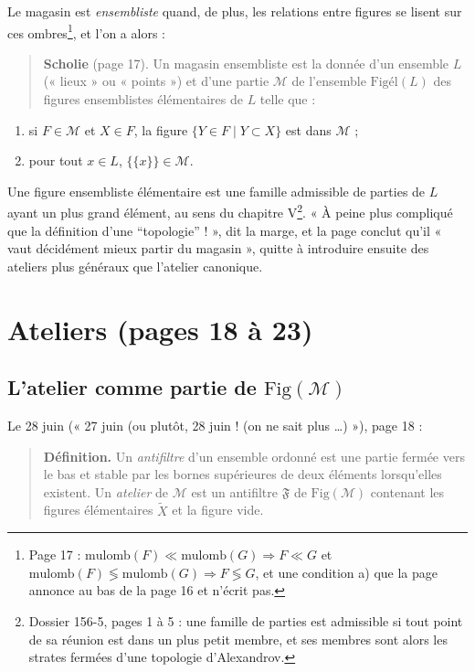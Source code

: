 \documentclass[11pt,a4paper]{article}
\begin{document}
Le magasin est \emph{ensembliste} quand, de plus, les relations entre figures
se lisent sur ces ombres\footnote{Page 17 : $\mathrm{mulomb}(F) \ll
\mathrm{mulomb}(G) \Rightarrow F \ll G$ et $\mathrm{mulomb}(F) \lessgtr
\mathrm{mulomb}(G) \Rightarrow F \lessgtr G$, et une condition a) que la page
annonce au bas de la page 16 et n'écrit pas.}, et l'on a alors :

\begin{quote}
\textbf{Scholie} (page 17). Un magasin ensembliste est la donnée d'un ensemble
$L$ (« lieux » ou « points ») et d'une partie $\mathcal{M}$ de l'ensemble
$\mathrm{Figél}(L)$ des figures ensemblistes élémentaires de $L$ telle que :
\end{quote}
\begin{enumerate}
\item[Magens 1.] si $F \in \mathcal{M}$ et $X \in F$, la figure $\{Y \in F \mid
Y \subset X\}$ est dans $\mathcal{M}$ ;
\item[Magens 2.] pour tout $x \in L$, $\{\{x\}\} \in \mathcal{M}$.
\end{enumerate}


Une figure ensembliste élémentaire est une famille admissible de parties de
$L$ ayant un plus grand élément, au sens du chapitre V\footnote{Dossier 156-5,
pages 1 à 5 : une famille de parties est admissible si tout point de sa
réunion est dans un plus petit membre, et ses membres sont alors les strates
fermées d'une topologie d'Alexandrov.}. « À peine plus compliqué que la
définition d'une “topologie” ! », dit la marge, et la page conclut qu'il « vaut
décidément mieux partir du magasin », quitte à introduire ensuite des ateliers
plus généraux que l'atelier canonique.

\section*{Ateliers (pages 18 à 23)}

\subsection*{L'atelier comme partie de $\mathrm{Fig}(\mathcal{M})$}

Le 28 juin (« 27 juin (ou plutôt, 28 juin ! (on ne sait plus …) »), page 18 :

\begin{quote}
\textbf{Définition.} Un \emph{antifiltre} d'un ensemble ordonné est une partie
fermée vers le bas et stable par les bornes supérieures de deux éléments
lorsqu'elles existent. Un \emph{atelier} de $\mathcal{M}$ est un antifiltre
$\mathfrak{F}$ de $\mathrm{Fig}(\mathcal{M})$ contenant les figures
élémentaires $\widetilde{X}$ et la figure vide.
\end{quote}
\end{document}
